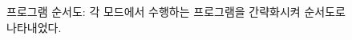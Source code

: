 \documentclass[chapter,11pt,oneside,openany]{xoblivoir}
\begin{document}
\begin{figure}[ht]
\begin{minipage}{0.34\textwidth}
\end{minipage}
\begin{minipage}{0.36\textwidth}
\end{minipage}

\caption[프로그램 순서도]{프로그램 순서도: 각 모드에서 수행하는 프로그램을 간략화시켜 순서도로 나타내었다.}
\end{figure}
\end{document}
